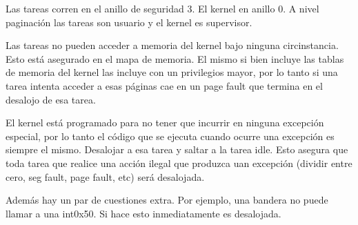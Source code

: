	Las tareas corren en el anillo de seguridad 3. El kernel en anillo 0.
A nivel paginación las tareas son usuario y el kernel es supervisor.

	Las tareas no pueden acceder a memoria del kernel bajo ninguna circinstancia.
Esto está asegurado en el mapa de memoria. El mismo si bien incluye las tablas de memoria
del kernel las incluye con un privilegios mayor, por lo tanto si una tarea intenta
acceder a esas páginas cae en un page fault que termina en el desalojo de esa tarea.

	El kernel está programado para no tener que incurrir en ninguna excepción especial,
por lo tanto el código que se ejecuta cuando ocurre una excepción es siempre el mismo. Desalojar
a esa tarea y saltar a la tarea idle. Esto asegura que toda tarea que realice una acción
ilegal que produzca uan excepción (dividir entre cero, seg fault, page fault, etc) será
desalojada.

	Además hay un par de cuestiones extra. Por ejemplo, una bandera no puede llamar a una int0x50.
Si hace esto inmediatamente es desalojada.

